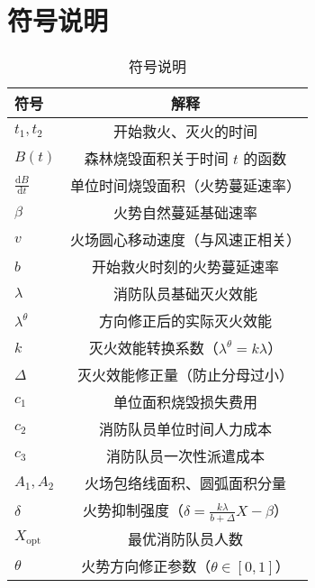 \section{符号说明}\label{sec:Notation}

\begin{table}[H]
    \centering
    \caption{符号说明}
    \label{tab:fire_symbols}
    \begin{tabular}{lc}
        \toprule
        符号 & 解释 \\
        \midrule
        $t_1, t_2$        & 开始救火、灭火的时间 \\
        $B(t)$            & 森林烧毁面积关于时间 $t$ 的函数 \\
        $\frac{\mathrm{d}B}{\mathrm{d}t}$   & 单位时间烧毁面积（火势蔓延速率） \\
        $\beta$           & 火势自然蔓延基础速率 \\
        $v$               & 火场圆心移动速度（与风速正相关） \\
        $b$               & 开始救火时刻的火势蔓延速率 \\
        $\lambda$         & 消防队员基础灭火效能 \\
        $\lambda^{\theta}$& 方向修正后的实际灭火效能 \\
        $k$               & 灭火效能转换系数（$\lambda^{\theta} = k\lambda$） \\
        $\Delta$          & 灭火效能修正量（防止分母过小） \\
        $c_1$             & 单位面积烧毁损失费用 \\
        $c_2$             & 消防队员单位时间人力成本 \\
        $c_3$             & 消防队员一次性派遣成本 \\
        $A_1, A_2$        & 火场包络线面积、圆弧面积分量 \\
        $\delta$          & 火势抑制强度（$\delta = \frac{k\lambda}{b+\Delta}X - \beta$） \\
        $X_{\text{opt}}$  & 最优消防队员人数 \\
        $\theta$          & 火势方向修正参数（$\theta \in [0,1]$） \\
        \bottomrule
    \end{tabular}
\end{table}
